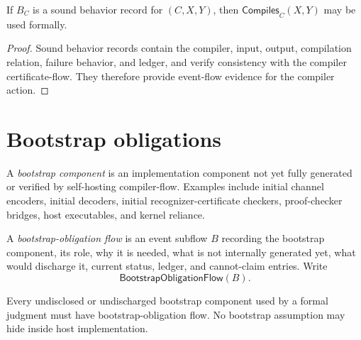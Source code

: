 \begin{theorem}
\label{thm:self-hosting-sound-behavior-record}
If $B_C$ is a sound behavior record for $(C,X,Y)$, then $\mathsf{Compiles}_{C}(X,Y)$ may be used formally.
\end{theorem}

\begin{proof}
Sound behavior records contain the compiler, input, output, compilation relation, failure behavior, and ledger, and verify consistency with the compiler certificate-flow. They therefore provide event-flow evidence for the compiler action.
\end{proof}

\section{Bootstrap obligations}
\label{sec:self-hosting-bootstrap}

\begin{definition}
\label{def:self-hosting-bootstrap-component}
A \emph{bootstrap component} is an implementation component not yet fully generated or verified by self-hosting compiler-flow. Examples include initial channel encoders, initial decoders, initial recognizer-certificate checkers, proof-checker bridges, host executables, and kernel reliance.
\end{definition}

\begin{definition}
\label{def:self-hosting-bootstrap-obligation-flow}
A \emph{bootstrap-obligation flow} is an event subflow $B$ recording the bootstrap component, its role, why it is needed, what is not internally generated yet, what would discharge it, current status, ledger, and cannot-claim entries. Write
$$
  \mathsf{BootstrapObligationFlow}(B).
$$
\end{definition}

\begin{principle}
\label{prin:self-hosting-no-invisible-bootstrap}
Every undisclosed or undischarged bootstrap component used by a formal judgment must have bootstrap-obligation flow. No bootstrap assumption may hide inside host implementation.
\end{principle}

